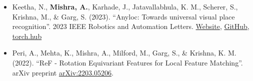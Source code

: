     \begin{itemize}
        \setlength{\itemsep}{0mm}
        \item Keetha, N., {\bf Mishra, A.}, Karhade, J., Jatavallabhula, K.
            M., Scherer, S., Krishna, M., \& Garg, S. (2023). ``Anyloc:
            Towards universal visual place recognition''. 2023 IEEE
            Robotics and Automation Letters.
            \href{https://anyloc.github.io/}{Website},
            \href{https://github.com/AnyLoc/AnyLoc}{GitHub},
            \href{https://github.com/AnyLoc/DINO}{torch.hub}
        \item Peri, A., Mehta, K., Mishra, A., Milford, M., Garg, S., 
            \& Krishna, K. M. (2022). ``ReF - Rotation Equivariant 
            Features for Local Feature Matching''. arXiv preprint 
            \href{https://arxiv.org/abs/2203.05206}{arXiv:2203.05206}.
    \end{itemize}


